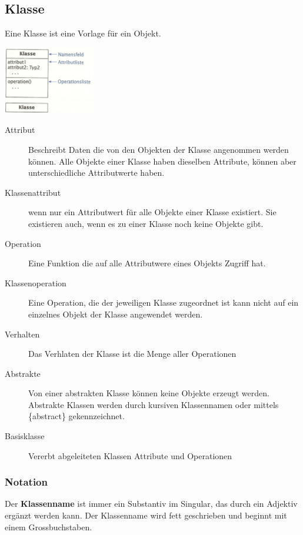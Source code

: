 	\subsection{Klasse }
	Eine Klasse ist eine Vorlage für ein Objekt. \\
	\begin{minipage}[t]{4cm}\includegraphics[width=4cm]{./images/klasse.png}\end{minipage}
	\begin{minipage}[c]{16cm}
		\begin{description}
		\item[Attribut] Beschreibt Daten die von den Objekten der Klasse angenommen
			werden können. Alle Objekte einer Klasse haben dieselben Attribute, können
			aber unterschiedliche Attributwerte haben.
		\item[Klassenattribut] wenn nur ein Attributwert für alle Objekte einer Klasse
			existiert. Sie existieren auch, wenn es zu einer Klasse noch keine Objekte
			gibt.
		\item[Operation] Eine Funktion die auf alle Attributwere eines Objekts Zugriff
			hat.
		\item[Klassenoperation] Eine Operation, die der jeweiligen Klasse zugeordnet
			ist kann nicht auf ein einzelnes Objekt der Klasse angewendet werden. 
		\item[Verhalten] Das Verhlaten der Klasse ist die Menge aller Operationen
		\item[Abstrakte] Von einer abstrakten Klasse können keine Objekte erzeugt
			werden. Abstrakte Klassen werden durch kursiven Klassennamen oder mittels
			\{abstract\} gekennzeichnet.
		\item[Basisklasse] Vererbt abgeleiteten Klassen Attribute und Operationen
		\end{description}
	\end{minipage}
	\subsubsection{Notation}
		Der \textbf{Klassenname} ist immer ein Substantiv im Singular, das durch ein Adjektiv
		ergänzt werden kann. Der Klassenname wird fett geschrieben und beginnt mit einem
		Grossbuchstaben. \\
		
